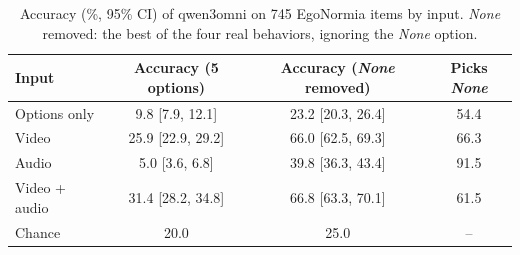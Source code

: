 \begin{table}[t]
\centering
\small
\begin{tabular}{lccc}
\toprule
Input & Accuracy (5 options) & Accuracy (\textit{None} removed) & Picks \textit{None} \\
\midrule
Options only & 9.8 {\scriptsize [7.9, 12.1]} & 23.2 {\scriptsize [20.3, 26.4]} & 54.4 \\
Video & 25.9 {\scriptsize [22.9, 29.2]} & 66.0 {\scriptsize [62.5, 69.3]} & 66.3 \\
Audio & 5.0 {\scriptsize [3.6, 6.8]} & 39.8 {\scriptsize [36.3, 43.4]} & 91.5 \\
Video + audio & 31.4 {\scriptsize [28.2, 34.8]} & 66.8 {\scriptsize [63.3, 70.1]} & 61.5 \\
\midrule
Chance & 20.0 & 25.0 & -- \\
\bottomrule
\end{tabular}
\caption{Accuracy (\%, 95\% CI) of qwen3omni on 745 EgoNormia items by input. \textit{None} removed: the best of the four real behaviors, ignoring the \textit{None} option.}
\label{tab:qwen3omni_accuracy}
\end{table}
